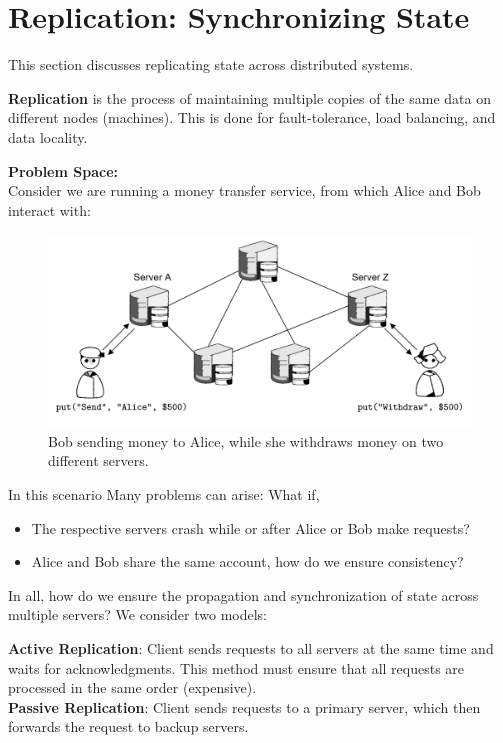 \newpage
\section{Replication: Synchronizing State}

This section discusses replicating state across distributed systems.

\begin{Def}[Replication]

    \textbf{Replication} is the process of maintaining multiple copies of the same data on different nodes (machines). 
    This is done for fault-tolerance, load balancing, and data locality.
\end{Def}

\noindent
\textbf{Problem Space:}\\
Consider we are running a money transfer service, from which Alice and Bob interact with:
\begin{figure}[h]
    \centering
    \includegraphics[width=.9\textwidth]{Sections/rep/intro.png}
    \caption{Bob sending money to Alice, while she withdraws money on two different servers.}
\end{figure}

\noindent
In this scenario Many problems can arise: What if,
\begin{itemize}
    \item The respective servers crash while or after Alice or Bob make requests?
    \item Alice and Bob share the same account, how do we ensure consistency?
\end{itemize}

\noindent
In all, how do we ensure the propagation and synchronization of state across multiple servers?
We consider two models:
\begin{Def}

    \textbf{Active Replication}: Client sends requests to all servers at the same time and waits for acknowledgments. This method must ensure that all 
    requests are processed in the same order (expensive).\\
    
    \noindent
    \textbf{Passive Replication}: Client sends requests to a primary server, which then forwards the request to backup servers.
\end{Def}

